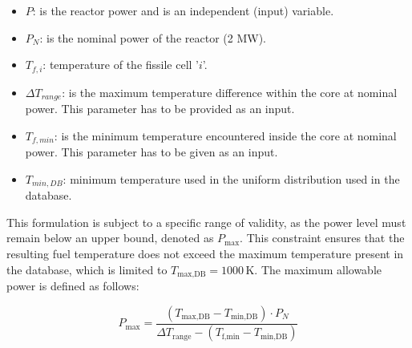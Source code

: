 \documentclass[preprint,review,12pt]{elsarticle}
\begin{document}
\begin{itemize}
    \item $P$: is the reactor power and is an independent (input) variable.
    \item $P_N$: is the nominal power of the reactor (2 MW). 
    \item $T_{f,i}$: temperature of the fissile cell '$i$'. 
    \item $\Delta T_{range} $: is the maximum temperature difference within the core at nominal power. This parameter has to be provided as an input.     
    \item $T_{f,min}$: is the minimum temperature encountered inside the core at nominal power. This parameter has to be given as an input.  
    \item $T_{min,DB}$: minimum temperature used in the uniform distribution used in the database.   
\end{itemize}

This formulation is subject to a specific range of validity, as the power level must remain below an upper bound, denoted as \( P_{\text{max}} \). This constraint ensures that the resulting fuel temperature does not exceed the maximum temperature present in the database, which is limited to \( T_{\text{max,DB}} = 1000\,\text{K} \). The maximum allowable power is defined as follows:

\begin{equation}
P_{\text{max}} = \frac{(T_{\text{max,DB}} - T_{\text{min,DB}})\cdot P_N}{\Delta T_{\text{range}} - (T_{\text{f,min}} - T_{\text{min,DB}})}
\label{eq:maximum_power_formulation}
\end{equation}


\end{document}
